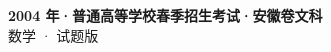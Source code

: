 \documentclass[zihao=-4, a4paper]{ctexart}
\begin{document}
\begin{center}
  {\Large\bfseries 2004 年·普通高等学校春季招生考试·安徽卷文科}\\[4pt]
  {\large 数学 · 试题版}
\end{center}
\medskip
{}

\end{document}
